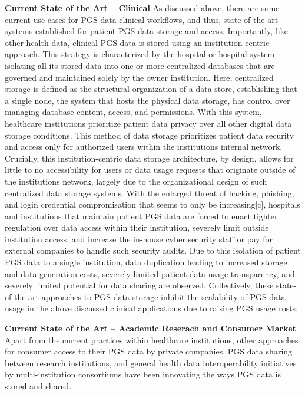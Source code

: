 \documentclass{article}
\begin{document}
\textbf{Current State of the Art -- Clinical}
As discussed above, there are some current use cases for PGS data clinical workflows, and thus, state-of-the-art systems established for  patient PGS data storage and access. 
Importantly, like other health data, clinical PGS data is stored using an \underline{institution-centric approach}. 
This strategy is characterized by the hospital or hospital system isolating all its stored data into one or more centralized databases that are governed and maintained solely by the owner institution. 
Here, centralized storage is defined as the structural organization of a data store, establishing that a single node, the system that hosts the physical data storage, has control over managing database content, access, and permissions. 
With this system, healthcare institutions prioritize patient data privacy over all other digital data storage conditions. 
This method of data storage prioritizes patient data security and access only for authorized users within the institution\textquotesingle s internal network. 
Crucially, this institution-centric data storage architecture, by design, allows for little to no accessibility for users or data usage requests that originate outside of the institution\textquotesingle s network, largely due to the organizational design of such centralized data storage systems. 
With the enlarged threat of hacking, phishing, and login credential compromisation that seems to only be increasing[c], hospitals and institutions that maintain patient PGS data are forced to enact tighter regulation over data access within their institution, severely limit outside institution access, and increase the in-house cyber security staff or pay for external companies to handle such security audits.  
Due to this isolation of patient PGS data to a single institution, data duplication leading to increased storage and data generation costs, severely limited patient data usage transparency, and severely limited potential for data sharing are observed. 
Collectively, these state-of-the-art approaches to PGS data storage inhibit the scalability of PGS data usage in the above discussed clinical applications due to raising PGS usage costs.

\textbf{Current State of the Art -- Academic Reserach and Consumer Market}
Apart from the current practices within healthcare institutions, other approaches for consumer access to their PGS data by private companies, PGS data sharing between research institutions, and general health data interoperability initiatives by multi-institution consortiums have been innovating the ways PGS data is stored and shared. 
\end{document}

